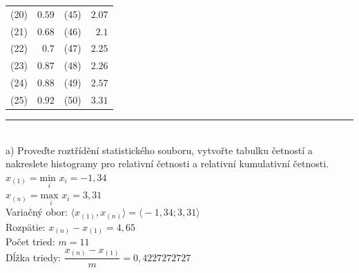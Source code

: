 \documentclass[pdftex, 11pt, a4paper, titlepage]{article}
\begin{document}
\begin{table}[H]
\begin{tabular}{r|r|r|r|}
			(20) & $ 0.59 $ & (45) & $ 2.07 $ \\ \cline{2-2} \cline{4-4}
			(21) & $ 0.68 $ & (46) & $ 2.1 $ \\ \cline{2-2} \cline{4-4}
			(22) & $ 0.7 $ & (47) & $ 2.25 $ \\ \cline{2-2} \cline{4-4}
			(23) & $ 0.87 $ & (48) & $ 2.26 $ \\ \cline{2-2} \cline{4-4}
			(24) & $ 0.88 $ & (49) & $ 2.57 $ \\ \cline{2-2} \cline{4-4}
            (25) & $ 0.92 $ & (50) & $ 3.31 $ \\ \cline{2-2} \cline{4-4}
        \end{tabular}
    \end{table}

    \noindent\rule{\linewidth}{0.4pt}\\

    \noindent
    a) Proveďte roztřídění statistického souboru, vytvořte tabulku
    četností a nakreslete histogramy pro relativní četnosti a relativní
    kumulativní četnosti.\\
    
    \noindent
    $ x_{(1)} = \underset{i}{\text{min }}x_i = -1,34 $ \\
    $ x_{(n)} = \underset{i}{\text{max }}x_i = 3,31 $ \\
    Variačný obor: $ \langle{} x_{(1)}, x_{(n)} \rangle{} = \langle{} -1,34;3,31 \rangle{}$ \\
    Rozpätie: $ x_{(n)} - x_{(1)} = 4,65 $ \\
    Počet tried: $ m = 11 $ \\
    Dĺžka triedy: $ \dfrac{x_{(n)} - x_{(1)}}{m} = 0,4227272727 $ \\
\end{document}
